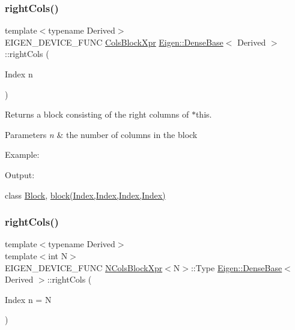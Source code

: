 \subsubsection{\texorpdfstring{rightCols()}{rightCols()}\hspace{0.1cm}{\footnotesize\ttfamily [1/2]}}
{\footnotesize\ttfamily template$<$typename Derived$>$ \\
E\+I\+G\+E\+N\+\_\+\+D\+E\+V\+I\+C\+E\+\_\+\+F\+U\+NC \mbox{\hyperlink{class_eigen_1_1_block}{Cols\+Block\+Xpr}} \mbox{\hyperlink{class_eigen_1_1_dense_base}{Eigen\+::\+Dense\+Base}}$<$ Derived $>$\+::right\+Cols (\begin{DoxyParamCaption}\item[{Index}]{n }\end{DoxyParamCaption})\hspace{0.3cm}{\ttfamily [inline]}}

\begin{DoxyReturn}{Returns}
a block consisting of the right columns of $\ast$this.
\end{DoxyReturn}

\begin{DoxyParams}{Parameters}
{\em n} & the number of columns in the block\\
\hline
\end{DoxyParams}
Example\+: 
\begin{DoxyCodeInclude}{0}
\end{DoxyCodeInclude}
 Output\+: 
\begin{DoxyVerbInclude}
\end{DoxyVerbInclude}
 class \mbox{\hyperlink{class_eigen_1_1_block}{Block}}, \mbox{\hyperlink{class_eigen_1_1_dense_base_ab8e42e67c5cfd5fa13e684642f0f65bf}{block(\+Index,\+Index,\+Index,\+Index)}} \mbox{\label{class_eigen_1_1_dense_base_a5f6341e6fd02fa2a7304a0933d01c866}} 
\subsubsection{\texorpdfstring{rightCols()}{rightCols()}\hspace{0.1cm}{\footnotesize\ttfamily [2/2]}}
{\footnotesize\ttfamily template$<$typename Derived$>$ \\
template$<$int N$>$ \\
E\+I\+G\+E\+N\+\_\+\+D\+E\+V\+I\+C\+E\+\_\+\+F\+U\+NC \mbox{\hyperlink{struct_eigen_1_1_dense_base_1_1_n_cols_block_xpr}{N\+Cols\+Block\+Xpr}}$<$N$>$\+::Type \mbox{\hyperlink{class_eigen_1_1_dense_base}{Eigen\+::\+Dense\+Base}}$<$ Derived $>$\+::right\+Cols (\begin{DoxyParamCaption}\item[{Index}]{n = {\ttfamily N} }\end{DoxyParamCaption})\hspace{0.3cm}{\ttfamily [inline]}}

